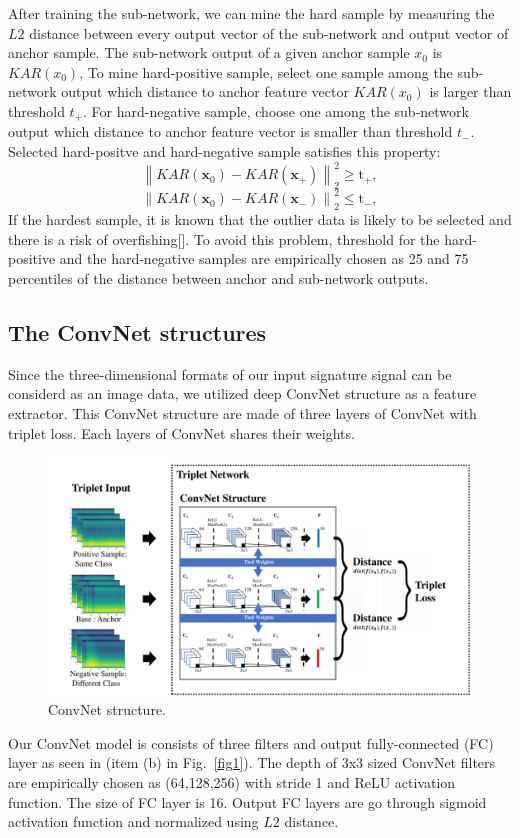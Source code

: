 After training the sub-network, we can mine the hard sample by measuring the $L2$ distance between every output vector of the sub-network and output vector of anchor sample.
The sub-network output of a given anchor sample $x_0$ is $KAR(x_0)$, To mine hard-positive sample, select one sample among the sub-network output which distance to anchor feature vector $KAR(x_0)$ is larger than threshold $t_+$. For hard-negative sample, choose one among the sub-network output which distance to anchor feature vector is smaller than threshold $t_-$.
Selected hard-positve and hard-negative sample satisfies this property:
\begin{equation}
    {\left\| {{KAR\left(\mathbf{x}_{0}\right)} - {KAR\left(\mathbf{x}_{+}\right)}} \right\|_2^2} \geq \mathrm{t}_{+}, 
    \label{thres_pos}
\end{equation}
\begin{equation}
    {\left\| {{KAR\left(\mathbf{x}_{0}\right)} - {KAR\left(\mathbf{x}_{-}\right)}} \right\|_2^2} \leq \mathrm{t}_{-},\label{thres_neg}
\end{equation}
If the hardest sample, it is known that the outlier data is likely to be selected and there is a risk of overfishing[].
To avoid this problem, threshold for the hard-positive and the hard-negative samples are empirically chosen as 25 and 75 percentiles of the distance between anchor and sub-network outputs.

\subsection{The ConvNet structures}
Since the three-dimensional formats of our input signature signal can be considerd as an image data, we utilized deep ConvNet structure as a feature extractor. This ConvNet structure are made of three layers of ConvNet with triplet loss. Each layers of ConvNet shares their weights. 
\begin{figure}[!ht]
    \includegraphics[width=\textwidth]
        {fig_convnet_v1.pdf}
    \caption{ConvNet structure.} \label{fig3}
\end{figure}
Our ConvNet model is consists of three filters and output fully-connected (FC) layer as seen in (item (b) in Fig.~\ref{fig1}). The depth of 3x3 sized ConvNet filters are empirically chosen as (64,128,256) with stride 1 and ReLU activation function. The size of FC layer is 16. Output FC layers are go through sigmoid activation function and normalized using $L2$ distance.
